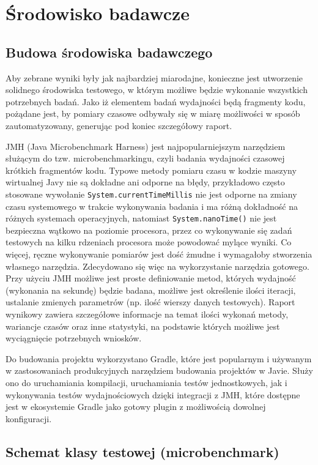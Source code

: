 \documentclass[12pt]{extarticle}
\begin{document}
\section{Środowisko badawcze}

\subsection{Budowa środowiska badawczego}

    Aby zebrane wyniki były jak najbardziej miarodajne, konieczne jest utworzenie solidnego środowiska testowego, w którym możliwe będzie wykonanie wszystkich potrzebnych badań. Jako iż elementem badań wydajności będą fragmenty kodu, pożądane jest, by pomiary czasowe odbywały się w miarę możliwości w sposób zautomatyzowany, generując pod koniec szczegółowy raport.

    JMH (Java Microbenchmark Harness) jest najpopularniejszym narzędziem służącym do tzw. microbenchmarkingu, czyli badania wydajności czasowej krótkich fragmentów kodu. Typowe metody pomiaru czasu w kodzie maszyny wirtualnej Javy nie są dokładne ani odporne na błędy, przykładowo często stosowane wywołanie \texttt{System.currentTimeMillis} nie jest odporne na zmiany czasu systemowego w trakcie wykonywania badania i ma różną dokładność na różnych systemach operacyjnych, natomiast \texttt{System.nanoTime()} nie jest bezpieczna wątkowo na poziomie procesora, przez co wykonywanie się zadań testowych na kilku rdzeniach procesora może powodować mylące wyniki. Co więcej, ręczne wykonywanie pomiarów jest dość żmudne i wymagałoby stworzenia własnego narzędzia. Zdecydowano się więc na wykorzystanie narzędzia gotowego. Przy użyciu JMH możliwe jest proste definiowanie metod, których wydajność (wykonania na sekundę) będzie badana, możliwe jest określenie ilości iteracji, ustalanie zmienych parametrów (np. ilość wierszy danych testowych). Raport wynikowy zawiera szczegółowe informacje na temat ilości wykonań metody, wariancje czasów oraz inne statystyki, na podstawie których możliwe jest wyciągnięcie potrzebnych wniosków.

    Do budowania projektu wykorzystano Gradle, które jest popularnym i używanym w zastosowaniach produkcyjnych narzędziem budowania projektów w Javie. Służy ono do uruchamiania kompilacji, uruchamiania testów jednostkowych, jak i wykonywania testów wydajnościowych dzięki integracji z JMH, które dostępne jest w ekosystemie Gradle jako gotowy plugin z możliwością dowolnej konfiguracji.

\subsection{Schemat klasy testowej (microbenchmark)}
\end{document}

